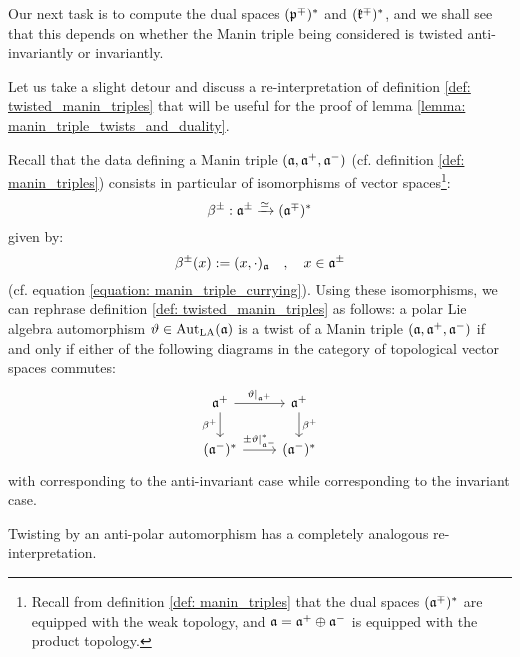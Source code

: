        Our next task is to compute the dual spaces $(\mathfrak{p}^{\mp})^*$ and $(\mathfrak{k}^{\mp})^*$, and we shall see that this depends on whether the Manin triple being considered is twisted anti-invariantly or invariantly.
        \begin{remark} \label{remark: manin_triple_twists_via_currying}
            Let us take a slight detour and discuss a re-interpretation of definition \ref{def: twisted_manin_triples} that will be useful for the proof of lemma \ref{lemma: manin_triple_twists_and_duality}.
        
            Recall that the data defining a Manin triple $(\mathfrak{a}, \mathfrak{a}^+, \mathfrak{a}^-)$ (cf. definition \ref{def: manin_triples}) consists in particular of isomorphisms of vector spaces\footnote{Recall from definition \ref{def: manin_triples} that the dual spaces $(\mathfrak{a}^{\mp})^*$ are equipped with the weak topology, and $\mathfrak{a} = \mathfrak{a}^+ \oplus \mathfrak{a}^-$ is equipped with the product topology.}:
                $$\beta^{\pm}: \mathfrak{a}^{\pm} \xrightarrow[]{\simeq} (\mathfrak{a}^{\mp})^*$$
            given by:
                $$\beta^{\pm}(x) := (x, \cdot)_{\mathfrak{a}} \quad, \quad x \in \mathfrak{a}^{\pm}$$
            (cf. equation \eqref{equation: manin_triple_currying}). Using these isomorphisms, we can rephrase definition \ref{def: twisted_manin_triples} as follows: a polar Lie algebra automorphism $\vartheta \in \operatorname{Aut}_{\mathrm{LA}}(\mathfrak{a})$ is a twist of a Manin triple $(\mathfrak{a}, \mathfrak{a}^+, \mathfrak{a}^-)$ if and only if either of the following diagrams in the category of topological vector spaces commutes:
                \begin{equation} \label{diagram: manin_triple_twist_currying}
                    \begin{tikzcd}
                    	{\a^+} & {\a^+} \\
                    	{(\a^-)^*} & {(\a^-)^*}
                    	\arrow["\vartheta|_{\a^+}", from=1-1, to=1-2]
                    	\arrow["{\beta^+}"', from=1-1, to=2-1]
                    	\arrow["{\beta^+}", from=1-2, to=2-2]
                    	\arrow["{\pm \vartheta|_{\a^-}^*}", from=2-1, to=2-2]
                    \end{tikzcd}
                \end{equation}
            with \say{$-\vartheta^*$} corresponding to the anti-invariant case while \say{$\vartheta^*$} corresponding to the invariant case.

            Twisting by an anti-polar automorphism has a completely analogous re-interpretation.
        \end{remark}
